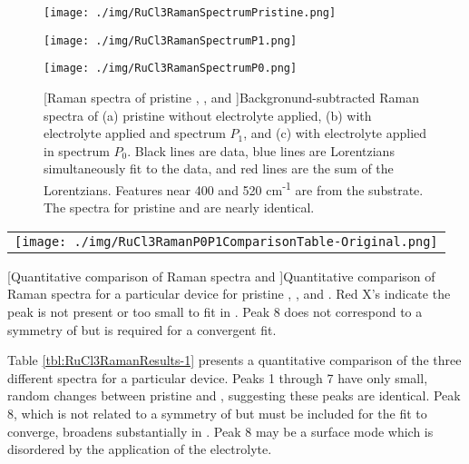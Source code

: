 \begin{figure}[p]
	\begin{minipage}{0.5\textwidth}
		\texttt{[image: ./img/RuCl3RamanSpectrumPristine.png]}
	\end{minipage}
	\hspace{\fill}
	\begin{minipage}{0.5\textwidth}
		\texttt{[image: ./img/RuCl3RamanSpectrumP1.png]}
	\end{minipage}
	
	\vspace*{1cm}
	
	\begin{minipage}{0.5\textwidth}
		\texttt{[image: ./img/RuCl3RamanSpectrumP0.png]}
	\end{minipage}
	\begin{minipage}{0.5\textwidth}
		[Raman spectra of pristine \ruclnospace , \pzero{}, and \pone]{Backgronund-subtracted Raman spectra of (a) pristine \rucl without electrolyte applied, (b) \rucl with electrolyte applied and spectrum $P_{1}$, and (c) \rucl with electrolyte applied in spectrum $P_{0}$. Black lines are data, blue lines are Lorentzians simultaneously fit to the data, and red lines are the sum of the Lorentzians. Features near 400 and 520 cm\textsuperscript{-1} are from the substrate. The spectra for pristine \rucl and \pzero{} are nearly identical.}
	\label{fig:RuCl3RamanResults-1}
	\end{minipage}
\end{figure}

\begin{center}
	\begin{tabular}{l}
		\texttt{[image: ./img/RuCl3RamanP0P1ComparisonTable-Original.png]}
	\end{tabular}
	[Quantitative comparison of Raman spectra \pzero{} and \pone]{Quantitative comparison of Raman spectra for a particular device for pristine \ruclnospace , \pzero , and \pone . Red X's indicate the peak is not present or too small to fit in \pone . Peak 8 does not correspond to a symmetry of \rucl but is required for a convergent fit.}
	\label{tbl:RuCl3RamanResults-1}
\end{center}

Table \ref{tbl:RuCl3RamanResults-1} presents a quantitative comparison of the three different spectra for a particular \rucl device. Peaks 1 through 7 have only small, random changes between pristine \rucl and \pzero , suggesting these peaks are identical. Peak 8, which is not related to a symmetry of \rucl but must be included for the fit to converge, broadens substantially in \pzero . Peak 8 may be a surface mode which is disordered by the application of the electrolyte.

